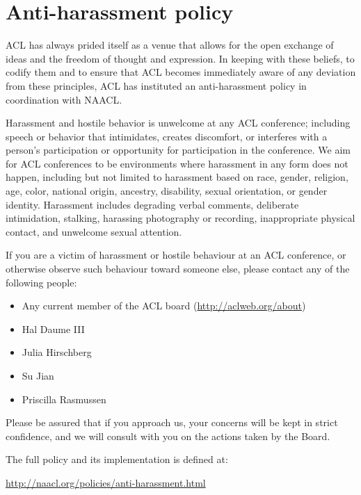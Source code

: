 \section[Anti-harassment policy]{Anti-harassment policy}
\thispagestyle{emptyheader}
\setheaders{}{}

ACL has always prided itself as a venue that allows for the open
exchange of ideas and the freedom of thought and expression. In
keeping with these beliefs, to codify them and to ensure that ACL
becomes immediately aware of any deviation from these principles, ACL
has instituted an anti-harassment policy in coordination with NAACL.

Harassment and hostile behavior is unwelcome at any ACL conference;
including speech or behavior that intimidates, creates discomfort, or
interferes with a person's participation or opportunity for
participation in the conference. We aim for ACL conferences to be
environments where harassment in any form does not happen, including
but not limited to harassment based on race, gender, religion, age,
color, national origin, ancestry, disability, sexual orientation, or
gender identity. Harassment includes degrading verbal comments,
deliberate intimidation, stalking, harassing photography or recording,
inappropriate physical contact, and unwelcome sexual attention.

If you are a victim of harassment or hostile behaviour at an ACL
conference, or otherwise observe such behaviour toward someone else,
please contact any of the following people:

\begin{itemize}
\item Any current member of the ACL board (\url{http://aclweb.org/about})
\item Hal Daume III 
\item Julia Hirschberg 
\item Su Jian 
\item Priscilla Rasmussen 
\end{itemize}

Please be assured that if you approach us, your concerns will be kept
in strict confidence, and we will consult with you on the actions
taken by the Board.

The full policy and its implementation is defined at:

\url{http://naacl.org/policies/anti-harassment.html}
